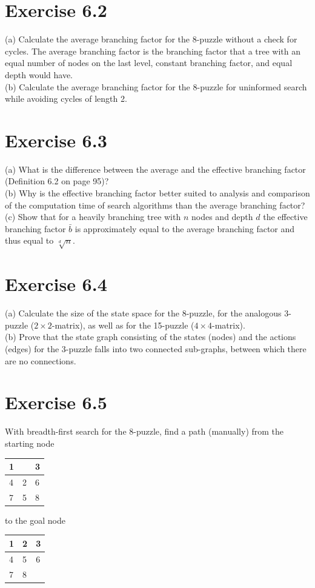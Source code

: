 \documentclass[10pt]{book}
\begin{document}
\section{Exercise 6.2}
(a) Calculate the average branching factor for the 8-puzzle without a check for cycles. The average branching factor is the branching factor that a tree with an equal number of nodes on the last level, constant branching factor, and equal depth would have.\\
(b) Calculate the average branching factor for the 8-puzzle for uninformed search while avoiding cycles of length 2.

\section{Exercise 6.3}
(a) What is the difference between the average and the effective branching factor (Definition 6.2 on page 95)?\\
(b) Why is the effective branching factor better suited to analysis and comparison of the computation time of search algorithms than the average branching factor?\\
(c) Show that for a heavily branching tree with $n$ nodes and depth $d$ the effective branching factor $\bar{b}$ is approximately equal to the average branching factor and thus equal to $\sqrt[d]{n}$.

\section{Exercise 6.4}
(a) Calculate the size of the state space for the 8-puzzle, for the analogous 3-puzzle ($2 \times 2$-matrix), as well as for the 15-puzzle ($4 \times 4$-matrix).\\
(b) Prove that the state graph consisting of the states (nodes) and the actions (edges) for the 3-puzzle falls into two connected sub-graphs, between which there are no connections.

\section{Exercise 6.5}
With breadth-first search for the 8-puzzle, find a path (manually) from the starting node

\begin{center}
\begin{tabular}{|l|l|l|}
\hline
1 &  & 3 \\
\hline
4 & 2 & 6 \\
\hline
7 & 5 & 8 \\
\hline
\end{tabular}
\end{center}
to the goal node
\begin{center}
\begin{tabular}{|l|l|l|}
\hline
1 & 2 & 3 \\
\hline
4 & 5 & 6 \\
\hline
7 & 8 &  \\
\hline
\end{tabular}
\end{center}
\end{document}

